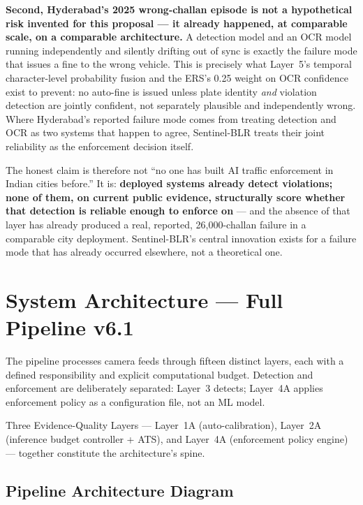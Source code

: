 \documentclass[11pt,a4paper]{article}
\begin{document}
\noindent\textbf{Second, Hyderabad's 2025 wrong-challan episode is not a hypothetical risk invented for this proposal --- it already happened, at comparable scale, on a comparable architecture.} A detection model and an OCR model running independently and silently drifting out of sync is exactly the failure mode that issues a fine to the wrong vehicle. This is precisely what Layer~5's temporal character-level probability fusion and the ERS's 0.25 weight on OCR confidence exist to prevent: no auto-fine is issued unless plate identity \emph{and} violation detection are jointly confident, not separately plausible and independently wrong. Where Hyderabad's reported failure mode comes from treating detection and OCR as two systems that happen to agree, Sentinel-BLR treats their joint reliability as the enforcement decision itself.

The honest claim is therefore not ``no one has built AI traffic enforcement in Indian cities before.'' It is: \textbf{deployed systems already detect violations; none of them, on current public evidence, structurally score whether that detection is reliable enough to enforce on} --- and the absence of that layer has already produced a real, reported, 26,000-challan failure in a comparable city deployment. Sentinel-BLR's central innovation exists for a failure mode that has already occurred elsewhere, not a theoretical one.

\section{System Architecture — Full Pipeline v6.1}

The pipeline processes camera feeds through fifteen distinct layers, each with a defined responsibility and explicit computational budget. Detection and enforcement are deliberately separated: Layer~3 detects; Layer~4A applies enforcement policy as a configuration file, not an ML model.

Three Evidence-Quality Layers --- Layer~1A (auto-calibration), Layer~2A (inference budget controller + ATS), and Layer~4A (enforcement policy engine) --- together constitute the architecture's spine.
\subsection*{Pipeline Architecture Diagram}
\end{document}

